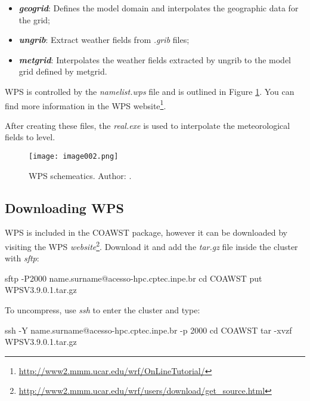 \begin{itemize}
\item \textbf{\textit{geogrid}}: Defines the model domain and interpolates the geographic data for the grid;
\item \textbf{\textit{ungrib}}: Extract weather fields from \textit{.grib} files;
\item \textbf{\textit{metgrid}}: Interpolates the weather fields extracted by ungrib to the model grid defined by metgrid.
\end{itemize}
\bigskip

 WPS is controlled by the \textit{namelist.wps} file and is outlined in Figure \textcolor{bleu_cite}{\ref{wpsdetalha}}. You can find more information in the WPS 
website\textcolor{bleu_cite}{\textit{}\footnote{\textcolor{bleu_cite}{\href{http://www2.mmm.ucar.edu/wrf/OnLineTutorial/}{http://www2.mmm.ucar.edu/wrf/OnLineTutorial/}}}}.
\bigskip

 After creating these files, the \textit{real.exe} is used to interpolate the meteorological fields to \texteta{}   level.
\bigskip

\begin{figure}[H]
    \centering
    \texttt{[image: image002.png]}
    \caption{WPS schemeatics. \newline Author: \textcite{duda2006}.}
    \label{wpsdetalha}
\end{figure}
\bigskip

\subsection{Downloading WPS}
\bigskip

 WPS is included in the COAWST package, however it can be downloaded by visiting the WPS
\textit{website}\textcolor{bleu_cite}{\footnote{\textcolor{bleu_cite}{\href{http://www2.mmm.ucar.edu/wrf/users/download/get\_source.html}{http://www2.mmm.ucar.edu/wrf/users/download/get\_source.html}}}}. 
Download it and add the \textit{tar.gz} file inside the cluster with \textit{sftp}:
\bigskip

\begin{bashcode}
sftp -P2000 name.surname@acesso-hpc.cptec.inpe.br
cd COAWST
put WPSV3.9.0.1.tar.gz
\end{bashcode}
\bigskip

 To uncompress, use \textit{ssh} to enter the cluster and type:
\bigskip

\begin{bashcode}
ssh -Y name.surname@acesso-hpc.cptec.inpe.br -p 2000
cd COAWST
tar -xvzf WPSV3.9.0.1.tar.gz
\end{bashcode}
\bigskip

